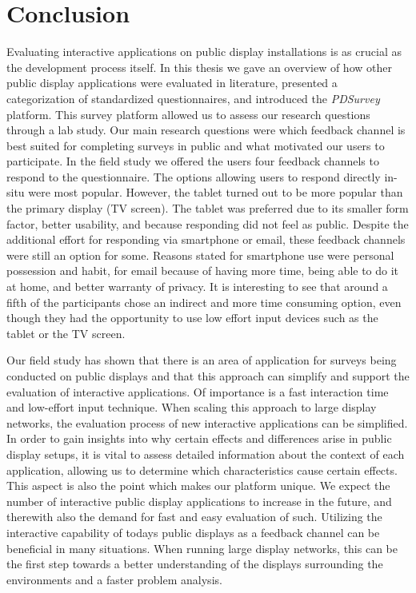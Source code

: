 \section{Conclusion}
\label{chapter:conclusion}

	Evaluating interactive applications on public display installations is as crucial as the development process itself. In this thesis we gave an overview of how other public display applications were evaluated in literature, presented a categorization of standardized questionnaires, and introduced the \textit{PDSurvey} platform. This survey platform allowed us to assess our research questions through a lab study. Our main research questions were which feedback channel is best suited for completing surveys in public and what motivated our users to participate. 
	In the field study we offered the users four feedback channels to respond to the questionnaire. The options allowing users to respond directly in-situ were most popular. However, the tablet turned out to be more popular than the primary display (TV screen). The tablet was preferred due to its smaller form factor, better usability, and because responding did not feel as public. Despite the additional effort for responding via smartphone or email, these feedback channels were still an option for some. Reasons stated for smartphone use were personal possession and habit, for email because of having more time, being able to do it at home, and better warranty of privacy. It is interesting to see that around a fifth of the participants chose an indirect and more time consuming option, even though they had the opportunity to use low effort input devices such as the tablet or the TV screen.

	Our field study has shown that there is an area of application for surveys being conducted on public displays and that this approach can simplify and support the evaluation of interactive applications. Of importance is a fast interaction time and low-effort input technique. When scaling this approach to large display networks, the evaluation process of new interactive applications can be simplified. In order to gain insights into why certain effects and differences arise in public display setups, it is vital to assess detailed information about the context of each application, allowing us to determine which characteristics cause certain effects. This aspect is also the point which makes our platform unique. 
	We expect the number of interactive public display applications to increase in the future, and therewith also the demand for fast and easy evaluation of such. Utilizing the interactive capability of todays public displays as a feedback channel can be beneficial in many situations. When running large display networks, this can be the first step towards a better understanding of the displays surrounding the environments and a faster problem analysis.

